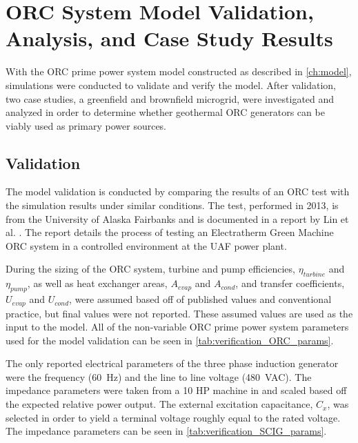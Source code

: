 \chapter{ORC System Model Validation, Analysis, and Case Study Results}
\label{ch:analysis}

With the ORC prime power system model constructed as described in \autoref{ch:model}, simulations were conducted to validate and verify the model. After validation, two case studies, a greenfield and brownfield microgrid, were investigated and analyzed in order to determine whether geothermal ORC generators can be viably used as primary power sources.

\section{Validation}
The model validation is conducted by comparing the results of an ORC test with the simulation results under similar conditions. The test, performed in 2013, is from the University of Alaska Fairbanks and is documented in a report by Lin et al. \cite{Lin2014}. The report details the process of testing an Electratherm Green Machine ORC system in a controlled environment at the UAF power plant.

During the sizing of the ORC system, turbine and pump efficiencies, 
$\eta_{turbine}$ and $\eta_{pump}$, as well as heat exchanger areas, $A_{evap}$ and $A_{cond}$, and transfer coefficients, $U_{evap}$ and $U_{cond}$, were assumed based off of published values and conventional practice, but final values were not reported. These assumed values are used as the input to the model. All of the non-variable ORC prime power system parameters used for the model validation can be seen in \autoref{tab:verification_ORC_params}.


The only reported electrical parameters of the three phase induction generator were the frequency (\SI{60}{\hertz}) and the line to line voltage (\SI{480}{\volt}AC). The impedance parameters were taken from a 10 HP machine in \cite{Ouazenne1983} and scaled based off the expected relative power output. The external excitation capacitance, $C_x$, was selected in order to yield a terminal voltage roughly equal to the rated voltage. The impedance parameters can be seen in \autoref{tab:verification_SCIG_params}.

%


